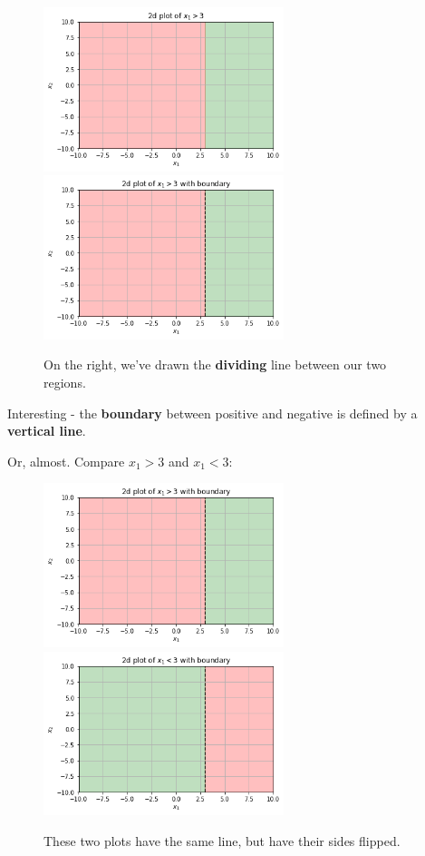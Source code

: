         \begin{figure}[H]
                \includegraphics[width=70mm,scale=0.5]{images/classification_images/x1_2d_plot.png}
                \includegraphics[width=70mm,scale=0.5]{images/classification_images/x1_2d_plot_boundary.png}
                
                \caption*{On the right, we've drawn the \textbf{dividing} line between our two regions.}
        \end{figure}
        
        Interesting - the \textbf{boundary} between positive and negative is defined by a \textbf{vertical line}.
        
        Or, almost. Compare $x_1>3$ and $x_1<3$:
        
        \begin{figure}[H]
                \includegraphics[width=70mm,scale=0.5]{images/classification_images/x1_2d_plot_boundary.png}
                \includegraphics[width=70mm,scale=0.5]{images/classification_images/x1_2d_plot_boundary_reversed.png}
                
                \caption*{These two plots have the same line, but have their sides flipped.}
        \end{figure}
        
